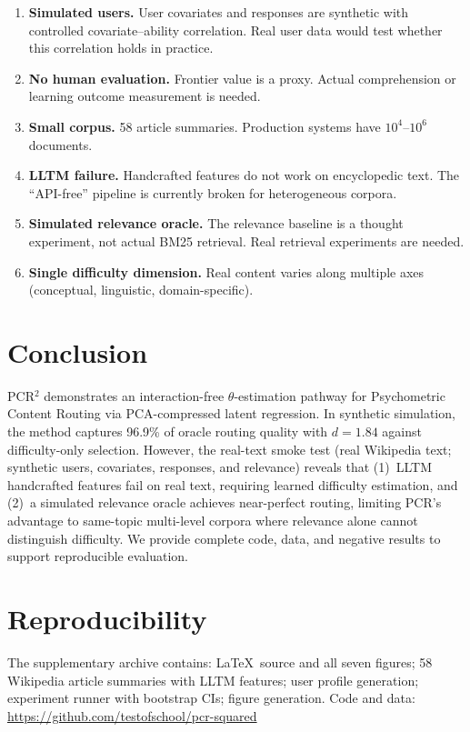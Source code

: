 \documentclass{article}
\begin{document}
\begin{enumerate}
    \item \textbf{Simulated users.} User covariates and responses are synthetic with controlled covariate--ability correlation. Real user data would test whether this correlation holds in practice.
    \item \textbf{No human evaluation.} Frontier value is a proxy. Actual comprehension or learning outcome measurement is needed.
    \item \textbf{Small corpus.} 58 article summaries. Production systems have $10^4$--$10^6$ documents.
    \item \textbf{LLTM failure.} Handcrafted features do not work on encyclopedic text. The ``API-free'' pipeline is currently broken for heterogeneous corpora.
    \item \textbf{Simulated relevance oracle.} The relevance baseline is a thought experiment, not actual BM25 retrieval. Real retrieval experiments are needed.
    \item \textbf{Single difficulty dimension.} Real content varies along multiple axes (conceptual, linguistic, domain-specific).
\end{enumerate}

\section{Conclusion}

PCR$^2$ demonstrates an interaction-free $\theta$-estimation pathway for Psychometric Content Routing via PCA-compressed latent regression. In synthetic simulation, the method captures 96.9\% of oracle routing quality with $d=1.84$ against difficulty-only selection. However, the real-text smoke test (real Wikipedia text; synthetic users, covariates, responses, and relevance) reveals that (1)~LLTM handcrafted features fail on real text, requiring learned difficulty estimation, and (2)~a simulated relevance oracle achieves near-perfect routing, limiting PCR's advantage to same-topic multi-level corpora where relevance alone cannot distinguish difficulty. We provide complete code, data, and negative results to support reproducible evaluation.

\section*{Reproducibility}

The supplementary archive contains: \LaTeX\ source and all seven figures; 58 Wikipedia article summaries with LLTM features; user profile generation; experiment runner with bootstrap CIs; figure generation. Code and data: \url{https://github.com/testofschool/pcr-squared}



\end{document}
